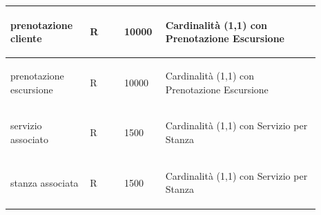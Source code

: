 \documentclass[12pt,a4paper]{article}
\begin{document}
\begin{center}
\begin{longtable}{|p{0.23\linewidth}|p{0.1\linewidth}|p{0.11\linewidth}|p{0.45\linewidth}|}
\hline
prenotazione cliente
 & 
\begin{center}\vspace{-25pt}R\end{center}
 & 
\begin{center}\vspace{-25pt}10000\end{center}
 & 
\begin{flushleft}\vspace{-25pt}Cardinalità (1,1) con Prenotazione Escursione\end{flushleft}
\\

\hline
prenotazione escursione
 & 
\begin{center}\vspace{-25pt}R\end{center}
 & 
\begin{center}\vspace{-25pt}10000\end{center}
 & 
\begin{flushleft}\vspace{-25pt}Cardinalità (1,1) con Prenotazione Escursione\end{flushleft}
\\

\hline
servizio associato
 & 
\begin{center}\vspace{-25pt}R\end{center}
 & 
\begin{center}\vspace{-25pt}1500\end{center}
 & 
\begin{flushleft}\vspace{-25pt}Cardinalità (1,1) con Servizio per Stanza\end{flushleft}
\\

\hline
stanza associata
 & 
\begin{center}\vspace{-25pt}R\end{center}
 & 
\begin{center}\vspace{-25pt}1500\end{center}
 & 
\begin{flushleft}\vspace{-25pt}Cardinalità (1,1) con Servizio per Stanza\end{flushleft}
\\

\hline

\end{longtable}\end{center}
\end{document}
